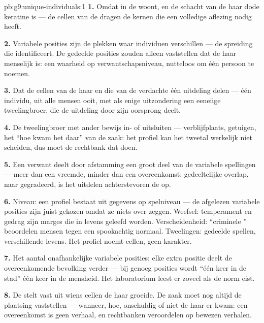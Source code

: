 \begin{solution}{pb:g9:unique-individuals:1}
\textbf{1.} Omdat  in de  woont, en de schacht van de
haar dode keratine is --- de cellen van de  dragen de kernen
die een volledige aflezing nodig heeft.

\textbf{2.} Variabele posities zijn de plekken waar individuen
verschillen --- de spreiding die identificeert. De gedeelde
posities zouden alleen vaststellen dat de haar menselijk is: een
waarheid op verwantschapsniveau, nutteloos om één persoon te
noemen.

\textbf{3.} Dat de cellen van de haar en die van de verdachte één
uitdeling delen --- één individu, uit alle mensen ooit, met als
enige uitzondering een eeneiige tweelingbroer, die de uitdeling
door zijn oorsprong deelt.

\textbf{4.} De tweelingbroer met ander bewijs in- of uitsluiten
--- verblijfplaats, getuigen, het ``hoe kwam het daar'' van de
zaak: het profiel kan het tweetal werkelijk niet scheiden, dus
moet de rechtbank dat doen.

\textbf{5.} Een verwant deelt door afstamming een groot deel van
de variabele spellingen --- meer dan een vreemde, minder dan een
overeenkomst: gedeeltelijke overlap, naar  gegradeerd,
is het uitdelen achterstevoren de  op.

\textbf{6.} Niveau: een profiel bestaat uit gegevens op
spelniveau --- de afgelezen variabele posities zijn juist gekozen
omdat ze niets over  zeggen. Weefsel: temperament en
gedrag zijn marges die in levens geleefd worden. Verscheidenheid:
``criminele '' beoordelen mensen tegen een spookachtig
normaal. Tweelingen: gedeelde spellen, verschillende levens. Het
profiel noemt cellen, geen karakter.

\textbf{7.} Het aantal onafhankelijke variabele posities: elke
extra positie deelt de overeenkomende bevolking verder --- bij
genoeg posities wordt ``één keer in de stad'' één keer in de
mensheid. Het laboratorium leest er zoveel als de norm eist.

\textbf{8.} De  stelt vast uit wiens cellen de haar
groeide. De zaak moet nog altijd de plaatsing vaststellen ---
wanneer, hoe, onschuldig of niet de haar er kwam: een
overeenkomst is geen verhaal, en rechtbanken veroordelen op
bewezen verhalen.


\end{solution}
